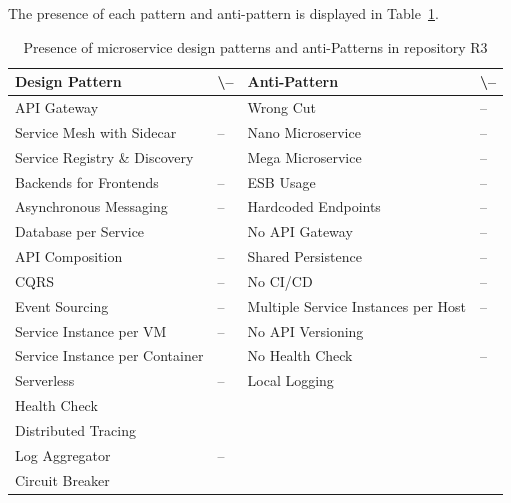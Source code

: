 \documentclass{Configuration_Files/PoliMi3i_thesis}
\newcommand{\cmark}{\ding{51}}%
\begin{document}
The presence of each pattern and anti-pattern is displayed in Table~\ref{table:R3_result}.

\begin{table}[H]
\centering 
    \begin{tabular}{ 
  | >{\centering\arraybackslash} m{16em} 
  | >{\centering\arraybackslash} m{2.2em} 
  | >{\centering\arraybackslash} m{16em} 
  | >{\centering\arraybackslash} m{2.2em} | }
    \hline
    \rowcolor{bluepoli!40}
    \textbf{Design Pattern} & \cmark \textbackslash – & \textbf{Anti-Pattern} & \cmark \textbackslash – \T\B \\
    \hline \hline
    API Gateway & \cmark & Wrong Cut & – \T\B\\
    \hline
    \rowcolor{bluepoli!10}
    Service Mesh with Sidecar & – & Nano Microservice & – \T\B \\
    \hline
    Service Registry \& Discovery & \cmark & Mega Microservice & – \T\B \\
    \hline
    \rowcolor{bluepoli!10}
    Backends for Frontends & – & ESB Usage & – \T\B \\
    \hline
    Asynchronous Messaging & – & Hardcoded Endpoints & – \T\B \\
    \hline
    \rowcolor{bluepoli!10}
    Database per Service & \cmark & No API Gateway & – \T\B \\
    \hline
    API Composition & – & Shared Persistence & – \T\B \\
    \hline
    \rowcolor{bluepoli!10}
    CQRS & – & No CI/CD & – \T\B \\
    \hline
    Event Sourcing & – & Multiple Service Instances per Host & – \T\B \\
    \hline
    \rowcolor{bluepoli!10}
    Service Instance per VM & – & No API Versioning & \cmark \T\B \\
    \hline
    Service Instance per Container & \cmark & No Health Check & – \T\B \\
    \hline
    \rowcolor{bluepoli!10}
    Serverless & – & Local Logging & \cmark \T\B \\
    \hline
    Health Check & \cmark &  & \T\B \\
    \hline
    \rowcolor{bluepoli!10}
    Distributed Tracing & \cmark & & \T\B \\
    \hline
    Log Aggregator & – &  & \T\B \\
    \hline
    \rowcolor{bluepoli!10}
    Circuit Breaker & \cmark &  & \T\B \\
    \hline
    \end{tabular}
    \\[10pt]
    \caption{Presence of microservice design patterns and anti-Patterns in repository R3}
    \label{table:R3_result}
\end{table}
\end{document}
